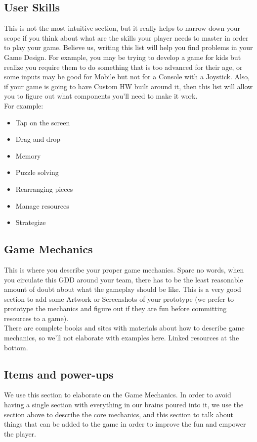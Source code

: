 \documentclass[12pt, a4paper]{article}
\begin{document}
\subsection{User Skills}
This is not the most intuitive section, but it really helps to narrow down your scope if you think about what are the skills your player needs to master in order to play your game. Believe us, writing this list will help you find problems in your Game Design. For example, you may be trying to develop a game for kids but realize you require them to do something that is too advanced for their age, or some inputs may be good for Mobile but not for a Console with a Joystick. Also, if your game is going to have Custom HW built around it, then this list will allow you to figure out what components you’ll need to make it work.\\

For example:
\begin{tcolorbox}
    \begin{itemize}
        \item Tap on the screen
        \item Drag and drop
        \item Memory
        \item Puzzle solving
        \item Rearranging pieces
        \item Manage resources
        \item Strategize
    \end{itemize}
\end{tcolorbox}

\subsection{Game Mechanics}
This is where you describe your proper game mechanics. Spare no words, when you circulate this GDD around your team, there has to be the least reasonable amount of doubt about what the gameplay should be like. This is a very good section to add some Artwork or Screenshots of your prototype (we prefer to prototype the mechanics and figure out if they are fun before committing resources to a game).\\

There are complete books and sites with materials about how to describe game mechanics, so we’ll not elaborate with examples here. Linked resources at the bottom.

\subsection{Items and power-ups}
We use this section to elaborate on the Game Mechanics. In order to avoid having a single section with everything in our brains poured into it, we use the section above to describe the core mechanics, and this section to talk about things that can be added to the game in order to improve the fun and empower the player.\\
\end{document}
